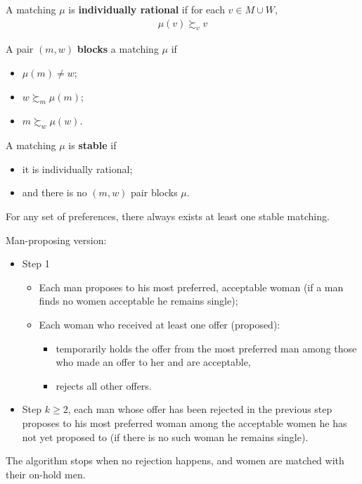 \documentclass{article}
\begin{document}
	\begin{definition}
		A matching $\mu$ is \textbf{individually rational} if for each $v \in M \cup W$,
		\begin{align}
			\mu(v) \succsim_v v
		\end{align}
	\end{definition}
	
	\begin{definition}
		A pair $(m, w)$ \textbf{blocks} a matching $\mu$ if
		\begin{itemize}
			\item $\mu(m) \neq w$;
			\item $w \succsim_m \mu(m)$;
			\item $m \succsim_w \mu(w)$.
		\end{itemize}
	\end{definition}
	
	\begin{definition}
		A matching $\mu$ is \textbf{stable} if
		\begin{itemize}
			\item it is individually rational;
			\item and there is no $(m, w)$ pair blocks $\mu$.
		\end{itemize}
	\end{definition}
	
	\begin{theorem}
		For any set of preferences, there always exists at least one stable matching.
	\end{theorem}
	
	\begin{algorithm} Man-proposing version:
		\begin{itemize}
			\item Step 1
			\begin{itemize}
				\item Each man proposes to his most preferred, acceptable woman (if a man finds no women acceptable he remains single);
				\item Each woman who received at least one offer (proposed):
				\begin{itemize}
					\item temporarily holds the offer from the most preferred man among those who made an offer to her and are acceptable,
					\item rejects all other offers.
				\end{itemize}
			\end{itemize}
			\item Step $k \geq 2$, each man whose offer has been rejected in the previous step proposes to his most preferred woman among the acceptable women he has not yet proposed to (if there is no such woman he remains single).
		\end{itemize}
		The algorithm stops when no rejection happens, and women are matched with their on-hold men.
	\end{algorithm}
	
\end{document}
